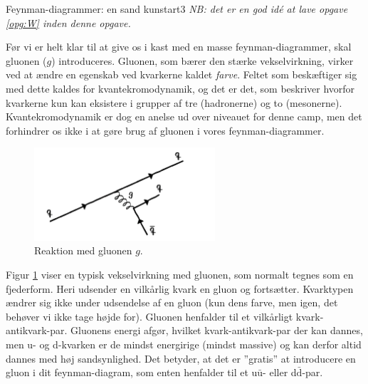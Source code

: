 \begin{opgave}{Feynman-diagrammer: en sand kunstart}{3}
\label{opg:feynman1}
\emph{NB: det er en god idé at lave opgave \ref{opg:W} inden denne opgave.}

Før vi er helt klar til at give os i kast med en masse
feynman-diagrammer, skal gluonen ($g$) introduceres. Gluonen, som
bærer den stærke vekselvirkning, virker ved at ændre en egenskab ved
kvarkerne kaldet \emph{farve}. Feltet som beskæftiger sig med dette
kaldes for kvantekromodynamik, og det er det, som beskriver hvorfor
kvarkerne kun kan eksistere i grupper af tre (hadronerne) og to
(mesonerne). Kvantekromodynamik er dog en anelse ud over niveauet for
denne camp, men det forhindrer os ikke i at gøre brug af gluonen i
vores feynman-diagrammer.
\begin{figure}[h!]
  \centering
  \includegraphics[width=0.6\textwidth]{KernePartikel/quark_interaction.png}
  \caption{Reaktion med gluonen $g$.}
  \label{fig:quark_inter}
\end{figure}
Figur \ref{fig:quark_inter} viser en typisk vekselvirkning med
gluonen, som normalt tegnes som en fjederform. Heri udsender en
vilkårlig kvark en gluon og fortsætter. Kvarktypen ændrer sig ikke
under udsendelse af en gluon (kun dens farve, men igen, det behøver vi
ikke tage højde for). Gluonen henfalder til et vilkårligt
kvark-antikvark-par. Gluonens energi afgør, hvilket
kvark-antikvark-par der kan dannes, men u- og d-kvarken er de mindst
energirige (mindst massive) og kan derfor altid dannes med høj
sandsynlighed. Det betyder, at det er ''gratis'' at introducere en gluon
i dit feynman-diagram, som enten henfalder til et u$\bar{\text{u}}$-
eller d$\bar{\text{d}}$-par.


\end{opgave}
